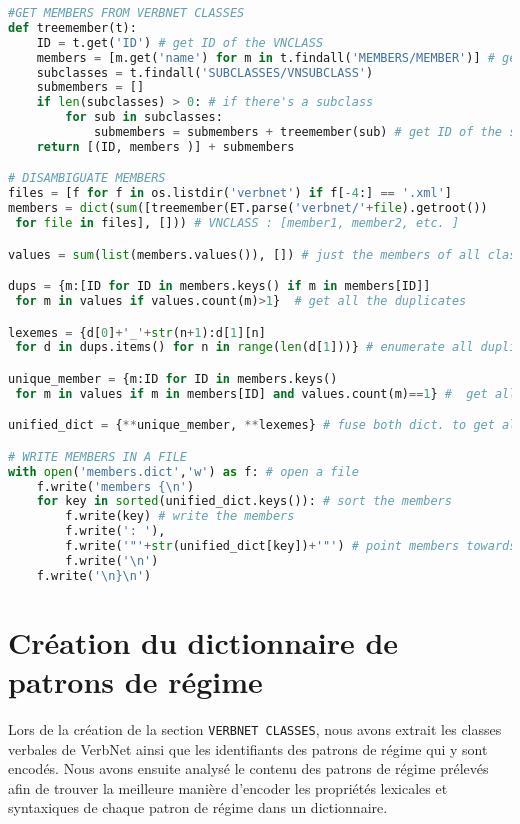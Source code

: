 \begin{lstlisting}[language=Python, caption = Ajout des membres de VerbNet, label=scriptmember]
#GET MEMBERS FROM VERBNET CLASSES
def treemember(t):
    ID = t.get('ID') # get ID of the VNCLASS
    members = [m.get('name') for m in t.findall('MEMBERS/MEMBER')] # get members 
    subclasses = t.findall('SUBCLASSES/VNSUBCLASS')
    submembers = []
    if len(subclasses) > 0: # if there's a subclass
        for sub in subclasses:
            submembers = submembers + treemember(sub) # get ID of the subclass and members
    return [(ID, members )] + submembers

# DISAMBIGUATE MEMBERS
files = [f for f in os.listdir('verbnet') if f[-4:] == '.xml']
members = dict(sum([treemember(ET.parse('verbnet/'+file).getroot())
 for file in files], [])) # VNCLASS : [member1, member2, etc. ]

values = sum(list(members.values()), []) # just the members of all classes

dups = {m:[ID for ID in members.keys() if m in members[ID]]
 for m in values if values.count(m)>1}  # get all the duplicates

lexemes = {d[0]+'_'+str(n+1):d[1][n]
 for d in dups.items() for n in range(len(d[1]))} # enumerate all duplicates: eat_1, eat_2

unique_member = {m:ID for ID in members.keys() 
 for m in values if m in members[ID] and values.count(m)==1} #  get all unique lexemes

unified_dict = {**unique_member, **lexemes} # fuse both dict. to get all members disambiguated

# WRITE MEMBERS IN A FILE
with open('members.dict','w') as f: # open a file
    f.write('members {\n')
    for key in sorted(unified_dict.keys()): # sort the members
        f.write(key) # write the members
        f.write(': '),
        f.write('"'+str(unified_dict[key])+'"') # point members towards ID of VNCLASS
        f.write('\n')
    f.write('\n}\n')
\end{lstlisting}

\section{Création du dictionnaire de patrons de régime}\label{sec:creategpcon}

Lors de la création de la section \texttt{VERBNET CLASSES}, nous avons extrait les classes verbales de VerbNet ainsi que les identifiants des patrons de régime qui y sont encodés. Nous avons ensuite analysé le contenu des patrons de régime prélevés afin de trouver la meilleure manière d'encoder les propriétés lexicales et syntaxiques de chaque patron de régime dans un dictionnaire.

